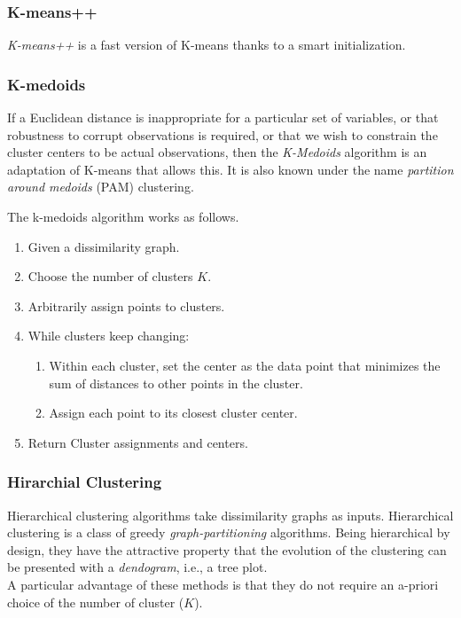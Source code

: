 \documentclass[]{book}
\providecommand{\tightlist}{%
  \setlength{\itemsep}{0pt}\setlength{\parskip}{0pt}}
\theoremstyle{definition}
\theoremstyle{definition}
\theoremstyle{remark}
\begin{document}
\subsubsection{K-means++}\label{k-means-1}

\emph{K-means++} is a fast version of K-means thanks to a smart
initialization.

\subsubsection{K-medoids}\label{k-medoids}

If a Euclidean distance is inappropriate for a particular set of
variables, or that robustness to corrupt observations is required, or
that we wish to constrain the cluster centers to be actual observations,
then the \emph{K-Medoids} algorithm is an adaptation of K-means that
allows this. It is also known under the name \emph{partition around
medoids} (PAM) clustering.

The k-medoids algorithm works as follows.

\begin{enumerate}
\def\labelenumi{\arabic{enumi}.}
\tightlist
\item
  Given a dissimilarity graph.
\item
  Choose the number of clusters \(K\).
\item
  Arbitrarily assign points to clusters.
\item
  While clusters keep changing:

  \begin{enumerate}
  \def\labelenumii{\arabic{enumii}.}
  \tightlist
  \item
    Within each cluster, set the center as the data point that minimizes
    the sum of distances to other points in the cluster.
  \item
    Assign each point to its closest cluster center.
  \end{enumerate}
\item
  Return Cluster assignments and centers.
\end{enumerate}

\subsubsection{Hirarchial Clustering}\label{hirarchial-clustering}

Hierarchical clustering algorithms take dissimilarity graphs as inputs.
Hierarchical clustering is a class of greedy \emph{graph-partitioning}
algorithms. Being hierarchical by design, they have the attractive
property that the evolution of the clustering can be presented with a
\emph{dendogram}, i.e., a tree plot.\\
A particular advantage of these methods is that they do not require an
a-priori choice of the number of cluster (\(K\)).
\end{document}
